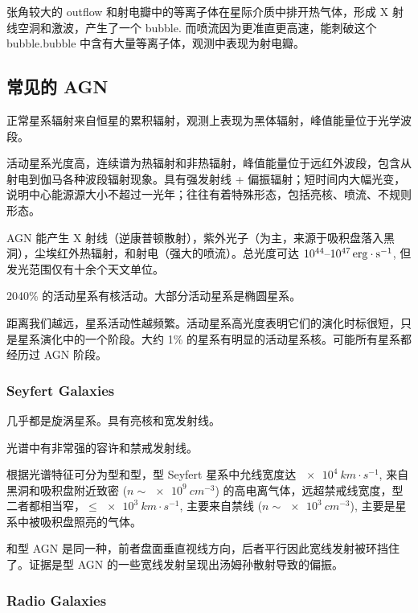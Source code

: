 \documentclass[../天体物理基础.tex]{subfiles}
\begin{document}
张角较大的 outflow 和射电瓣中的等离子体在星际介质中排开热气体，形成 X 射线空洞和激波，产生了一个 bubble. 而喷流因为更准直更高速，能刺破这个 bubble.bubble 中含有大量等离子体，观测中表现为射电瓣。

\subsection{常见的 AGN}
正常星系辐射来自恒星的累积辐射，观测上表现为黑体辐射，峰值能量位于光学波段。

活动星系光度高，连续谱为热辐射和非热辐射，峰值能量位于远红外波段，包含从射电到伽马各种波段辐射现象。具有强发射线 + 偏振辐射；短时间内大幅光变，说明中心能源源大小不超过一光年；往往有着特殊形态，包括亮核、喷流、不规则形态。

AGN 能产生 X 射线（逆康普顿散射），紫外光子（为主，来源于吸积盘落入黑洞），尘埃红外热辐射，和射电（强大的喷流）。总光度可达 $10^{44}\text{\textendash}\qty{e47}{erg\cdot{}s^{-1}}$, 但发光范围仅有十余个天文单位。

20\text{\textendash}40\% 的活动星系有核活动。大部分活动星系是椭圆星系。

距离我们越远，星系活动性越频繁。活动星系高光度表明它们的演化时标很短，只是星系演化中的一个阶段。大约 1\% 的星系有明显的活动星系核。可能所有星系都经历过 AGN 阶段。

\subsubsection{Seyfert Galaxies}
几乎都是旋涡星系。具有亮核和宽发射线。

光谱中有非常强的容许和禁戒发射线。

根据光谱特征可分为\uppercase\expandafter{}型和\uppercase\expandafter{}型，\uppercase\expandafter{}型 Seyfert 星系中允线宽度达 $\qty{e4}{km\cdot{}s^{-1}}$, 来自黑洞和吸积盘附近致密 ($n\sim\qty{e9}{cm^{-3}}$) 的高电离气体，远超禁戒线宽度，\uppercase\expandafter{}型二者都相当窄，$\le\qty{e3}{km\cdot{}s^{-1}}$, 主要来自禁线 ($n\sim\qty{e3}{cm^{-3}}$), 主要是星系中被吸积盘照亮的气体。

\uppercase\expandafter{}和\uppercase\expandafter{}型 AGN 是同一种，前者盘面垂直视线方向，后者平行因此宽线发射被环挡住了。证据是\uppercase\expandafter{}型 AGN 的一些宽线发射呈现出汤姆孙散射导致的偏振。

\subsubsection{Radio Galaxies}
\end{document}
